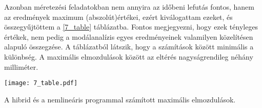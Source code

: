 Azonban méretezési feladatokban  nem annyira az időbeni lefutás fontos, hanem az eredmények  maximum (abszolút)értékei, ezért kiválogattam ezeket, és összegyűjtöttem a \ref{7_table} táblázatba. Fontos megjegyezni, hogy ezek tényleges értékek, nem pedig a modálanalízis egyes eredményeinek valamilyen közelítésen alapuló összegzése. 
A táblázatból látszik, hogy a számítások között minimális a különbség. A maximális elmozdulások között az eltérés nagyságrendileg néhány milliméter.

\begin{table}[h!]
\centering
\texttt{[image: 7\_table.pdf]}
\caption{A hibrid és a nemlineáris programmal számított maximális elmozdulások.}
\label{7_table}
\end{table}
